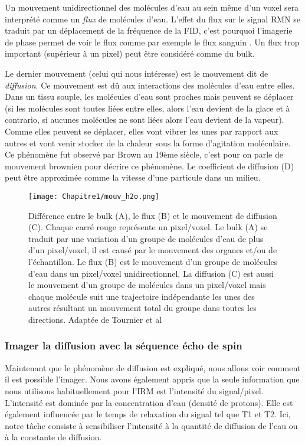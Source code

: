 Un mouvement unidirectionnel des molécules d’eau au sein même d’un voxel sera interprété comme un \textit{flux} de molécules d’eau. L’effet du flux sur le signal RMN se traduit par un déplacement de la fréquence de la FID, c’est pourquoi l’imagerie de phase permet de voir le flux comme par exemple le flux sanguin \cite{Wymer2020}. Un flux trop important (supérieur à un pixel) peut être considéré comme du bulk.

Le dernier mouvement (celui qui nous intéresse) est le mouvement dit de \textit{diffusion}. Ce mouvement est dû aux interactions des molécules d’eau entre elles. Dans un tissu souple, les molécules d’eau sont proches mais peuvent se déplacer (si les molécules sont toutes liées entre elles, alors l’eau devient de la glace et à contrario, si aucunes molécules ne sont liées alors l’eau devient de la vapeur). Comme elles peuvent se déplacer, elles vont vibrer les unes par rapport aux autres et vont venir stocker de la chaleur sous la forme d’agitation moléculaire. Ce phénomène fut observé par Brown au 19ème siècle, c’est pour on parle de mouvement brownien pour décrire ce phénomène. Le coefficient de diffusion (D) peut être approximée comme la vitesse d’une particule dans un milieu.

\begin{figure}[!htbp]
  \begin{center}
    \texttt{[image: Chapitre1/mouv\_h2o.png]}
     \end{center}
    \caption{Différence entre le bulk (A), le flux (B) et le mouvement de diffusion (C). Chaque carré rouge représente un pixel/voxel. Le bulk (A) se traduit par une variation d’un groupe de molécules d’eau de plus d’un pixel/voxel, il est causé par le mouvement des organes et/ou de l’échantillon. Le flux (B) est le mouvement d’un groupe de molécules d’eau dans un pixel/voxel unidirectionnel. La diffusion (C) est aussi le mouvement d’un groupe de molécules dans un pixel/voxel mais chaque molécule suit une trajectoire indépendante les unes des autres résultant un mouvement total du groupe dans toutes les directions. Adaptée de Tournier et al \cite{2014}}
  \label{fig:mouv_h2o}
\end{figure}

\subsubsection{Imager la diffusion avec la séquence écho de spin}

Maintenant que le phénomène de diffusion est expliqué, nous allons voir comment il est possible l’imager. Nous avons également appris que la seule information que nous utilisons habituellement pour l'IRM est l'intensité du signal/pixel. L'intensité est dominée par la concentration d'eau (densité de protons). Elle est également influencée par le temps de relaxation du signal tel que T1 et T2. Ici, notre tâche consiste à sensibiliser l'intensité à la quantité de diffusion de l'eau ou à la constante de diffusion.

